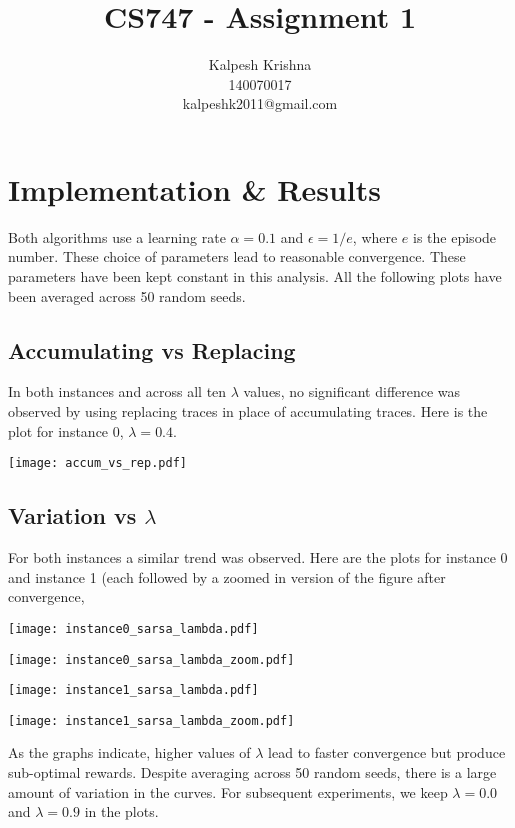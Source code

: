 \documentclass[11pt]{article}
\title{\textbf{CS747 - Assignment 1}}
\author{Kalpesh Krishna\\140070017\\kalpeshk2011@gmail.com}
\date{}
\begin{document}
\maketitle

\section{Implementation \& Results}
Both algorithms use a learning rate $\alpha = 0.1$ and $\epsilon = 1/e$, where $e$ is the episode number. These choice of parameters lead to reasonable convergence. These parameters have been kept constant in this analysis. All the following plots have been averaged across 50 random seeds.
\subsection{Accumulating vs Replacing}
In both instances and across all ten $\lambda$ values, no significant difference was observed by using replacing traces in place of accumulating traces. Here is the plot for instance $0$, $\lambda = 0.4$.
\begin{center}
\texttt{[image: accum\_vs\_rep.pdf]}
\end{center}
\subsection{Variation vs $\lambda$}
For both instances a similar trend was observed. Here are the plots for instance 0 and instance 1 (each followed by a zoomed in version of the figure after convergence,
\begin{center}
\texttt{[image: instance0\_sarsa\_lambda.pdf]}
\end{center}
\begin{center}
\texttt{[image: instance0\_sarsa\_lambda\_zoom.pdf]}
\end{center}
\begin{center}
\texttt{[image: instance1\_sarsa\_lambda.pdf]}
\end{center}
\begin{center}
\texttt{[image: instance1\_sarsa\_lambda\_zoom.pdf]}
\end{center}
\pagebreak
As the graphs indicate, higher values of $\lambda$ lead to faster convergence but produce sub-optimal rewards. Despite averaging across 50 random seeds, there is a large amount of variation in the curves. For subsequent experiments, we keep $\lambda = 0.0$ and $\lambda = 0.9$ in the plots.
\end{document}
